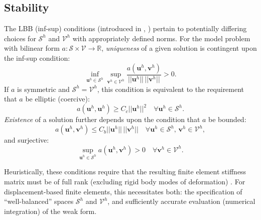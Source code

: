 	
\subsection*{Stability}

	The LBB (inf-sup) conditions (introduced in \cite{Babuska:71}, \cite{Brezzi:74}) pertain to potentially differing choices for $\mathcal{S}^h$ and $\mathcal{V}^h$ with appropriately defined norms. For the model problem with bilinear form $a \colon \mathcal{S} \times \mathcal{V} \rightarrow \mathbb{R}$, \textit{uniqueness} of a given solution is contingent upon the inf-sup condition:
	\begin{equation}
		\inf_{\bm{u}^h \in \mathcal{S}^h} \sup_{\bm{v}^h \in 
\mathcal{V}^h} \frac{a(\bm{u}^h,\bm{v}^h)}{||\bm{u}^h|| \, ||\bm{v}^h||} > 0.
	\end{equation}
	If $a$ is symmetric and $\mathcal{S}^h = \mathcal{V}^h$, this condition is equivalent to the requirement that $a$ be elliptic (coercive):
	\begin{equation}
		a(\bm{u}^h,\bm{u}^h) \geq C_c ||\bm{u}^h||^2 \quad \forall \bm{u}^h \in \mathcal{S}^h.
	\end{equation}
	\textit{Existence} of a solution further depends upon the condition that $a$ be bounded:
	\begin{equation}
		a(\bm{u}^h,\bm{v}^h) \leq C_b ||\bm{u}^h|| \, ||\bm{v}^h|| \quad \forall \bm{u}^h \in \mathcal{S}^h, \, \bm{v}^h \in \mathcal{V}^h,
	\end{equation}
	and surjective:
	\begin{equation}
		\sup_{\bm{u}^h \in 
\mathcal{S}^h} a(\bm{u}^h,\bm{v}^h) > 0 \quad \forall \bm{v}^h \in \mathcal{V}^h.
	\end{equation}
	
	Heuristically, these conditions require that the resulting finite element stiffness matrix must be of full rank (excluding rigid body modes of deformation) \cite{Bathe:06}. For displacement-based finite elements, this necessitates both: the specification of ``well-balanced'' spaces $\mathcal{S}^h$ and $\mathcal{V}^h$, and sufficiently accurate evaluation (numerical integration) of the weak form.
	

